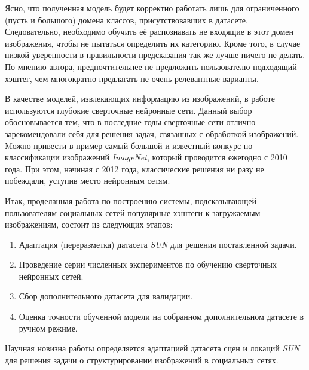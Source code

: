 \indent
\indent
Ясно, что полученная модель будет корректно работать лишь для
ограниченного (пусть и большого) домена классов, присутствовавших 
в датасете. Следовательно, необходимо 
обучить её распознавать не входящие в этот домен изображения, чтобы
не пытаться определить их категорию. Кроме того, в случае низкой уверенности
в правильности предсказания так же лучше ничего не делать. 
По мнению автора, предпочтительнее не 
предложить пользователю подходящий хэштег, чем многократно предлагать 
не очень релевантные варианты.
 

\indent
\indent
В качестве моделей, извлекающих информацию из изображений,
в работе используются глубокие сверточные
нейронные сети. Данный выбор обосновывается тем, что в последние
годы сверточные сети отлично зарекомендовали себя для решения задач, связанных
с обработкой изображений. Mожно привести в пример самый большой 
и известный
конкурс по классификации изображений \textit{ImageNet}\cite{imagenet},
который проводится ежегодно с 2010 года. При этом, начиная с 2012 года, классические
решения ни разу не побеждали, уступив место нейронным сетям.


\indent
\indent
Итак, проделанная работа по построению системы,
подсказывающей пользователям социальных
сетей популярные хэштеги к загружаемым изображениям,
состоит из следующих этапов:
\begin{enumerate}

    \item Адаптация (переразметка) датасета \textit{SUN} для
    решения поставленной задачи.
    
    \item Проведение серии численных экспериментов по обучению
    сверточных нейронных сетей.
    
    \item Сбор дополнительного датасета для валидации.
    
    \item Оценка точности обученной модели на собранном
    дополнительном датасете в ручном режиме.

\end{enumerate}


\indent
\indent
Научная новизна работы определяется адаптацией
датасета сцен и локаций \textit{SUN} для решения задачи о
структурировании изображений в социальных сетях.

 